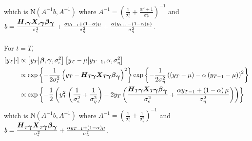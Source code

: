 \documentclass[fleqn]{article}
\def\bm#1{\mbox{\boldmath $#1$}}
\begin{document}
%
which is $\mbox{N}\left( A^{ - 1} b, A^{ - 1} \right)$ where $A^{ - 1} = \left( \frac{1} {\sigma^2_\epsilon} + \frac{\alpha^2 + 1} {\sigma^2_\eta} \right)^{ - 1}$ and $b = \frac{\bm{H}_{t \bm{\gamma}} \bm{X}_{t \bm{\gamma}} \bm{\beta}_{\bm{\gamma}}} {\sigma^2_\epsilon} + \frac{\alpha y_{t - 1} + \left( 1 - \alpha \right) \mu } {\sigma^2_\eta} + \frac{\alpha \left( y_{t + 1} - \left( 1 - \alpha \right) \mu  \right) } {\sigma^2_\eta}$. \\
\\
For $t = T$, 
%
\begin{align*}
%
\left[ y_T \middle| \cdot \right] & \propto \left[ y_T \middle| \bm{\beta}, \bm{\gamma}, \sigma^2_\epsilon \right] \left[ y_T - \mu \middle| y_{T - 1}, \alpha, \sigma^2_\eta \right] \\
%
& \propto \exp{ \left\{ - \frac{1} {2 \sigma^2_\epsilon} \left( y_T - \bm{H}_{T \bm{\gamma}} \bm{X}_{T \bm{\gamma}} \bm{\beta}_{\bm{\gamma}} \right)^2 \right\} } \exp{ \left\{ - \frac{1} {2 \sigma^2_\eta} \left( \left( y_T - \mu \right) - \alpha \left( y_{T - 1} - \mu \right) \right)^2 \right\} } \\
%
& \propto \exp{ \left\{ - \frac{1} {2} \left( y_T^2 \left( \frac{1} {\sigma^2_\epsilon} + \frac{1} {\sigma^2_\eta} \right) - 2 y_T \left( \frac{\bm{H}_{T \bm{\gamma}} \bm{X}_{T \bm{\gamma}} \bm{\beta}_{\bm{\gamma}}} {\sigma^2_\epsilon} + \frac{\alpha y_{T - 1} + \left( 1 - \alpha \right) \mu } {\sigma^2_\eta} \right) \right) \right\} } \\
%
\end{align*}
%
which is $\mbox{N}\left( A^{ - 1} b, A^{ - 1} \right)$ where $A^{ - 1} = \left( \frac{1} {\sigma^2_\epsilon} + \frac{1} {\sigma^2_\eta} \right)^{ - 1}$ and $b = \frac{\bm{H}_{T \bm{\gamma}} \bm{X}_{T \bm{\gamma}} \bm{\beta}_{\bm{\gamma}}} {\sigma^2_\epsilon} + \frac{\alpha y_{T - 1} + \left( 1 - \alpha \right) \mu } {\sigma^2_\eta}$. \\
\\
\end{document}
